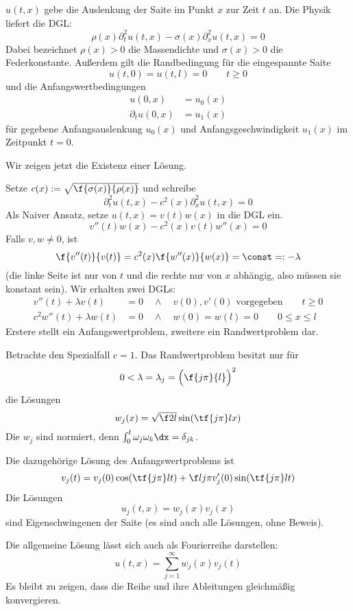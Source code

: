 \setcounter{thm}{4} %
\begin{ex} \label{3.5}
	$u(t,x)$ gebe die Auslenkung der Saite im Punkt $x$ zur Zeit $t$ an. 
	Die Physik liefert die DGL:
	\[
		\rho(x) \partial_t^2 u(t,x) - \sigma(x) \partial_x^2 u(t,x) = 0
	\]
	Dabei bezeichnet $\rho(x) > 0$ die Massendichte und $\sigma(x) > 0$ die Federkonstante.
	Außerdem gilt die Randbedingung für die eingespannte Saite
	\[
		u(t,0) = u(t,l) = 0
		\qquad t \ge 0
	\]
	und die Anfangswertbedingungen
	\begin{align*}
		u(0,x) &= u_0(x) \\
		\partial_t u(0,x) &= u_1(x)
	\end{align*}
	für gegebene Anfangsauslenkung $u_0(x)$ und Anfangsgeschwindigkeit $u_1(x)$ im Zeitpunkt $t = 0$.

	Wir zeigen jetzt die Existenz einer Lösung.

	Setze $c(x) := \sqrt{\f {\sigma(x)}{\rho(x)}}$ und schreibe
	\[
		\partial_t^2 u(t,x) - c^2(x) \partial_x^2 u(t,x) = 0
	\]
	Als Naiver Ansatz, setze $u(t,x) = v(t)w(x)$ in die DGL ein.
	\[
		v''(t) w(x) - c^2(x) v(t) w''(x) = 0
	\]
	Falls $v,w \neq 0$, ist
	\[
		\f {v''(t)}{v(t)} = c^2(x) \f {w''(x)}{w(x)} = \const =: - \lambda
	\]
	(die linke Seite ist nur von $t$ und die rechte nur von $x$ abhängig, also müssen sie konstant sein).
	Wir erhalten zwei DGLs:
	\begin{align*}
		v''(t) + \lambda v(t) &= 0 \quad \land  \quad v(0), v'(0) \text{ vorgegeben} \qquad t \ge 0 \\
		c^2 w''(t) + \lambda w(t) &= 0 \quad \land \quad w(0) = w(l) = 0 \qquad 0 \le x \le l
	\end{align*}
	Erstere stellt ein Anfangswertproblem, zweitere ein Randwertproblem dar.

	Betrachte den Spezialfall $c = 1$.
	Das Randwertproblem besitzt nur für 
	\[
		0 < \lambda = \lambda_j = \Big( \f {j\pi}{l} \Big)^2
	\]
	die Lösungen
	\[
		w_j(x) = \sqrt{\f 2l} \sin( \tf {j\pi}l x)
	\]
	Die $w_j$ sind normiert, denn $\int_{0}^l \omega_j \omega_k \dx = \delta_{jk}$.

	Die dazugehörige Lösung des Anfangswertproblems ist
	\[
		v_j(t) = v_j(0) \cos(\tf {j\pi}l t) + \f l{j\pi} v_j'(0) \sin(\tf{j\pi}l t)
	\]
	Die Lösungen
	\[
		u_j(t,x) = w_j(x) v_j(x)
	\]
	sind Eigenschwingenen der Saite (es sind auch alle Lösungen, ohne Beweis).
	
	Die allgemeine Lösung lässt sich auch als Fourierreihe darstellen:
	\[
		u(t,x) = \sum_{j=1}^\infty w_j(x) v_j(t)
	\]
	Es bleibt zu zeigen, dass die Reihe und ihre Ableitungen gleichmäßig konvergieren.
\end{ex}


